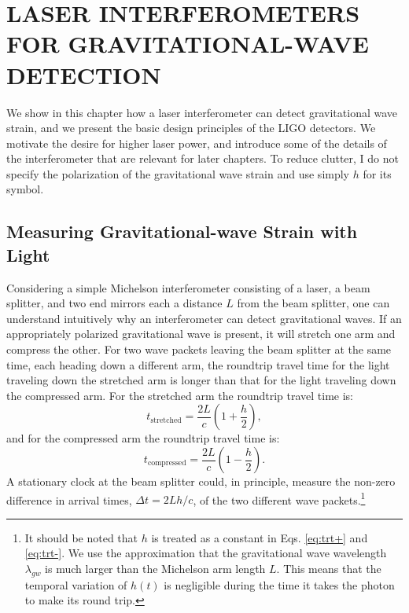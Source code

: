 \chapter{LASER INTERFEROMETERS FOR GRAVITATIONAL-WAVE DETECTION}

We show in this chapter how a laser interferometer can detect
gravitational wave strain, and we present the basic design principles
of the LIGO detectors. We motivate the desire for higher laser power,
and introduce some of the details of the interferometer that are
relevant for later chapters. To reduce clutter, I do not specify the
polarization of the gravitational wave strain and use simply $h$ for
its symbol.


\section{Measuring Gravitational-wave Strain with Light}
Considering a simple Michelson interferometer consisting of a laser, a
beam splitter, and two end mirrors each a distance $L$ from the beam
splitter, one can understand intuitively why an interferometer can
detect gravitational waves. If an appropriately polarized
gravitational wave is present, it will stretch one arm and compress
the other. For two wave packets leaving the beam splitter at the same
time, each heading down a different arm, the roundtrip travel time for
the light traveling down the stretched arm is longer than that for the
light traveling down the compressed arm. For the stretched arm the
roundtrip travel time is:
\begin{equation}
t_{\mathrm{stretched}} = \frac{2 L}{c} \left( 1 + \frac{h}{2} \right),
\label{eq:trt+} 
\end{equation}
and for the compressed arm the roundtrip travel time is:
\begin{equation}
t_{\mathrm{compressed}} = \frac{2 L}{c} \left( 1 - \frac{h}{2} \right).
\label{eq:trt-} 
\end{equation}
A stationary clock at the beam splitter could, in principle, measure
the non-zero difference in arrival times, $\Delta t = 2Lh/c$, of the
two different wave packets.\footnote{It should be noted that $h$ is
  treated as a constant in Eqs. \ref{eq:trt+} and \ref{eq:trt-}. We
  use the approximation that the gravitational wave wavelength
  $\lambda_{gw}$ is much larger than the Michelson arm length
  $L$. This means that the temporal variation of $h(t)$ is negligible
  during the time it takes the photon to make its round trip.}

